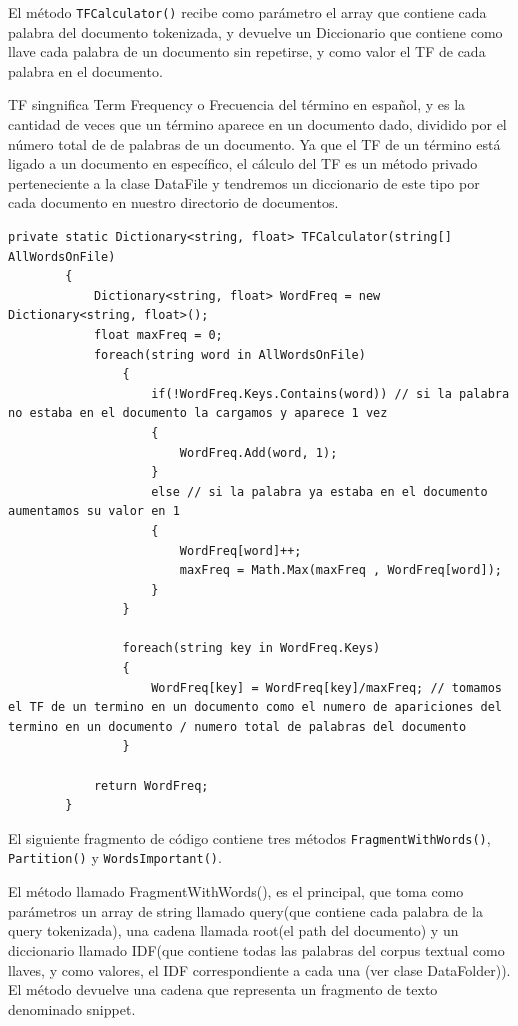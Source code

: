 \documentclass[12pt,a4paper]{report}
\begin{document}
El método \texttt{TFCalculator()} recibe como parámetro el array que contiene cada palabra del documento tokenizada, y devuelve un Diccionario que contiene como llave cada palabra de un documento sin repetirse, y como valor el TF de cada palabra en el documento.\par
TF singnifica Term Frequency o Frecuencia del término en español, y es la cantidad de veces que un término aparece en un documento dado, dividido por el número total de de palabras de un documento. 
Ya que el TF de un término está ligado a un documento en específico, el cálculo del TF es un método privado perteneciente a la clase DataFile y tendremos un diccionario de este tipo por cada documento en nuestro directorio de documentos.\par 

\begin{lstlisting}
private static Dictionary<string, float> TFCalculator(string[] AllWordsOnFile)
        {   
            Dictionary<string, float> WordFreq = new Dictionary<string, float>();
            float maxFreq = 0;
            foreach(string word in AllWordsOnFile)
                {  
                    if(!WordFreq.Keys.Contains(word)) // si la palabra no estaba en el documento la cargamos y aparece 1 vez
                    {
                        WordFreq.Add(word, 1);
                    }
                    else // si la palabra ya estaba en el documento aumentamos su valor en 1
                    {
                        WordFreq[word]++;
                        maxFreq = Math.Max(maxFreq , WordFreq[word]);
                    }
                }

                foreach(string key in WordFreq.Keys)
                {
                    WordFreq[key] = WordFreq[key]/maxFreq; // tomamos el TF de un termino en un documento como el numero de apariciones del termino en un documento / numero total de palabras del documento
                }

            return WordFreq;
        }
\end{lstlisting}\par\bigskip

El siguiente fragmento de código contiene tres métodos \texttt{FragmentWithWords()}, \texttt{Partition()} y \texttt{WordsImportant()}.\par

El método llamado FragmentWithWords(), es el principal, que toma como parámetros un array de string llamado query(que contiene cada palabra de la query tokenizada), una cadena llamada root(el path del documento) y un diccionario llamado IDF(que contiene todas las palabras del corpus textual como llaves, y como valores, el IDF correspondiente a cada una (ver clase DataFolder)). El método devuelve una cadena que representa un fragmento de texto denominado snippet.\par
\end{document}
